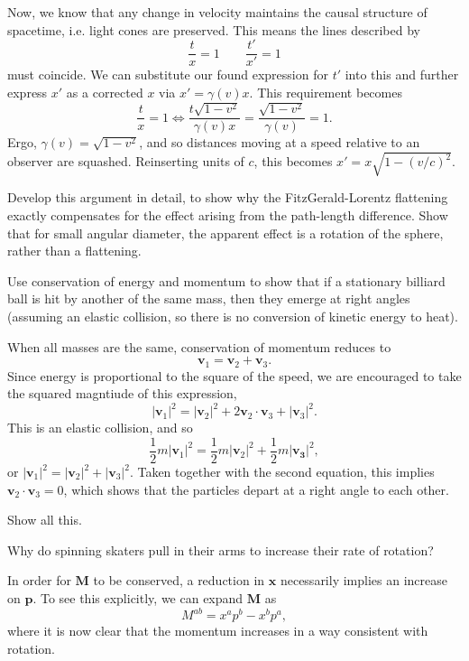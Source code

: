 \documentclass[../road-to-reality.tex]{subfiles}
\begin{document}
\begin{questions}
\begin{solution}
    Now, we know that any change in velocity maintains the causal structure of
    spacetime, i.e. light cones are preserved. This means the lines described by
    \[
      \frac{t}{x} = 1 \qquad \frac{t'}{x'} = 1
    \]
    must coincide. We can substitute our found expression for $t'$ into this and further
    express $x'$ as a corrected $x$ via $x' = \gamma(v)x$. This requirement
    becomes
    \[
      \frac{t}{x} = 1 \iff \frac{t\sqrt{1-v^2}}{\gamma(v)x} =
      \frac{\sqrt{1-v^2}}{\gamma(v)} = 1.
    \]
    Ergo, $\gamma(v) = \sqrt{1-v^2}$, and so distances moving at a speed
    relative to an observer are squashed. Reinserting units of $c$, this becomes
    $x' = x\sqrt{1-(v/c)^2}$.
  \end{solution}

\question Develop this argument in detail, to show why the FitzGerald-Lorentz flattening exactly compensates for the effect arising from the path-length difference. Show that for small angular diameter, the apparent effect is a rotation of the sphere, rather than a flattening.

\question Use conservation of energy and momentum to show that if a stationary billiard ball is hit by another of the same mass, then they emerge at right angles (assuming an elastic collision, so there is no conversion of kinetic energy to heat).

  \begin{solution}
    When all masses are the same, conservation of momentum reduces to
    \[
      \mathbf{v}_1 = \mathbf{v}_2 + \mathbf{v}_3.
    \]
    Since energy is proportional to the square of the speed, we are encouraged
    to take the squared magntiude of this expression,
    \[
      |\mathbf{v}_1|^2 = |\mathbf{v}_2|^2 + 2\mathbf{v}_2\cdot\mathbf{v}_3 + |\mathbf{v}_3|^2.
    \]
    This is an elastic collision, and so
    \[
      \frac{1}{2}m|\mathbf{v}_1|^2 = \frac{1}{2}m|\mathbf{v}_2|^2 + \frac{1}{2}m|\mathbf{v_3}|^2,
    \]
    or $|\mathbf{v}_1|^2 = |\mathbf{v}_2|^2 + |\mathbf{v}_3|^2$. Taken together
    with the second equation, this implies $\mathbf{v}_2\cdot\mathbf{v}_3=0$,
    which shows that the particles depart at a right angle to each other.
  \end{solution}

\question Show all this.

\question Why do spinning skaters pull in their arms to increase their rate of rotation?

  \begin{solution}
    In order for $\mathbf{M}$ to be conserved, a reduction in $\mathbf{x}$
    necessarily implies an increase on $\mathbf{p}$. To see this explicitly, we
    can expand $\mathbf{M}$ as
    \[
      {M}^{ab} = x^ap^b - x^bp^a,
    \]
    where it is now clear that the momentum increases in a way consistent with rotation.
  \end{solution}


\end{questions}
\end{document}
